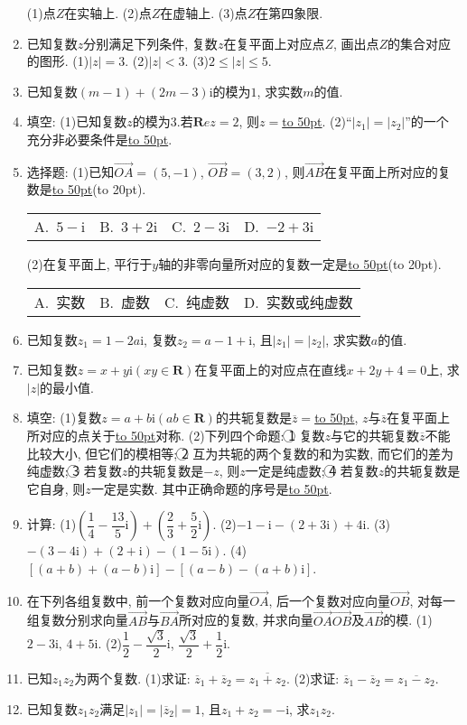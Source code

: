 \documentclass[10pt,a4paper]{article}
\newcommand{\blank}[1]{\underline{\hbox to #1pt{}}}
\newcommand{\bracket}[1]{(\hbox to #1pt{})}
\newcommand{\fourch}[4]{\par\begin{tabular}{p{.23\textwidth}p{.23\textwidth}p{.23\textwidth}p{.23\textwidth}}
A.~#1 &B.~#2& C.~#3& D.~#4
\end{tabular}}
\begin{document}
\begin{enumerate}[1.]
(1)点$Z$在实轴上.
(2)点$Z$在虚轴上.
(3)点$Z$在第四象限.
\item 已知复数$z$分别满足下列条件, 复数$z$在复平面上对应点$Z$, 画出点$Z$的集合对应的图形.
(1)$|z|=3$.								(2)$|z|<3$.
(3)$2\le|z|\le 5$.
\item 已知复数$(m-1)+(2m-3)\mathrm{i}$的模为$1$, 求实数$m$的值.
\item 填空:
(1)已知复数$z$的模为$3$.若$\mathbf Rez=2$, 则$z=$\blank{50}.
(2)``$|z_1|=|z_2|$''的一个充分非必要条件是\blank{50}.
\item 选择题:
(1)已知$\overrightarrow{OA}=(5,-1)$, $\overrightarrow{OB}=(3,2)$, 则$\overrightarrow{AB}$在复平面上所对应的复数是\blank{50}\bracket{20}.
\fourch{$5-\mathrm{i}$}{$3+2\mathrm{i}$}{$2-3\mathrm{i}$}{$-2+3\mathrm{i}$}
(2)在复平面上, 平行于$y$轴的非零向量所对应的复数一定是\blank{50}\bracket{20}.
\fourch{实数}{虚数}{纯虚数}{实数或纯虚数}
\item 已知复数$z_1=1-2a\mathrm{i}$, 复数$z_2=a-1+\mathrm{i}$, 且$|z_1|=|z_2|$, 求实数$a$的值.
\item 已知复数$z=x+y\mathrm{i}(xy\in \mathbf{R})$在复平面上的对应点在直线$x+2y+4=0$上, 求$|z|$的最小值.
\item 填空:
(1)复数$z=a+b\mathrm{i}(ab\in \mathbf{R})$的共轭复数是$\overline  z=$\blank{50}, $z$与$\overline  z$在复平面上所对应的点关于\blank{50}对称.
(2)下列四个命题:
\textcircled{1} 复数$z$与它的共轭复数$\overline  z$不能比较大小, 但它们的模相等;
\textcircled{2} 互为共轭的两个复数的和为实数, 而它们的差为纯虚数;
\textcircled{3} 若复数$z$的共轭复数是$-z$, 则$z$一定是纯虚数;
\textcircled{4} 若复数$z$的共轭复数是它自身, 则$z$一定是实数.
其中正确命题的序号是\blank{50}.
\item 计算:
(1)$(\dfrac 14-\dfrac{13}5\mathrm{i})+(\dfrac 23+\dfrac 52\mathrm{i})$.		(2)$-1-\mathrm{i}-(2+3\mathrm{i})+4\mathrm{i}$.
(3)$-(3-4\mathrm{i})+(2+\mathrm{i})-(1-5\mathrm{i})$.	(4)$[(a+b)+(a-b)\mathrm{i}]-[(a-b)-(a+b)\mathrm{i}]$.
\item 在下列各组复数中, 前一个复数对应向量$\overrightarrow{OA}$, 后一个复数对应向量$\overrightarrow{OB}$, 对每一组复数分别求向量$\overrightarrow{AB}$与$\overrightarrow{BA}$所对应的复数, 并求向量$\overrightarrow{OA}\overrightarrow{OB}$及$\overrightarrow{AB}$的模.
(1)$2-3\mathrm{i}$, $4+5\mathrm{i}$.						(2)$\dfrac 12-\dfrac{\sqrt 3}2\mathrm{i}$, $\dfrac{\sqrt 3}2+\dfrac 12\mathrm{i}$.
\item 已知$z_1z_2$为两个复数.
(1)求证: $\overline z_1+\overline z_2=\overline {z_1+z_2}$.
(2)求证: $\overline z_1-\overline z_2=\overline {z_1-z_2}$.
\item 已知复数$z_1z_2$满足$|z_1|=|\overline  z_2|=1$, 且$z_1+z_2=-\mathrm{i}$, 求$z_1z_2$.

\end{enumerate}
\end{document}
